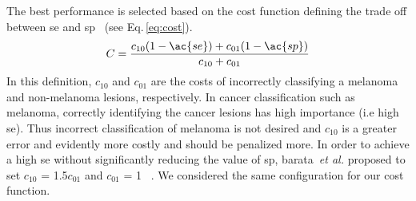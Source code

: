 The best performance is selected based on the cost function defining the trade off between \ac{se} and \ac{sp}~\cite{barata2013towards} (see Eq.\,\ref{eq:cost}).
\begin{equation}\label{eq:cost}
C = \frac{c_{10}(1-\ac{se})+c_{01}(1-\ac{sp})}{c_{10}+c_{01}}
\end{equation}
\noindent In this definition, $c_{10}$ and $c_{01}$ are the costs of incorrectly classifying a melanoma and non-melanoma lesions, respectively.
In cancer classification such as melanoma, correctly identifying the cancer lesions has high importance (i.e high \ac{se}). 
Thus incorrect classification of melanoma is not desired and $c_{10}$ is a greater error and evidently more costly and should be penalized more. 
In order to achieve a high \ac{se} without significantly reducing the value of \ac{sp}, barata~\emph{et al.} proposed to set $c_{10}$ = 1.5$c_{01}$ and $c_{01}$ = 1 ~\cite{barata2013towards}.  
We considered the same configuration for our cost function. 


